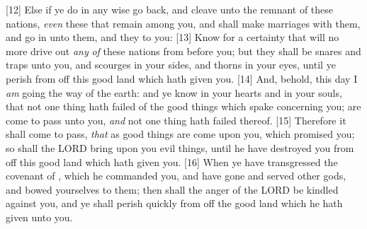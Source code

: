 [12] \textcolor[cmyk]{0.99998,1,0,0}{Else if ye do in any wise go back, and cleave unto the remnant of these nations, \emph{even} these that remain among you, and shall make marriages with them, and go in unto them, and they to you:}
[13] \textcolor[cmyk]{0.99998,1,0,0}{Know for a certainty that  will no more drive out \emph{any} \emph{of} these nations from before you; but they shall be snares and traps unto you, and scourges in your sides, and thorns in your eyes, until ye perish from off this good land which  hath given you.}
[14] \textcolor[cmyk]{0.99998,1,0,0}{And, behold, this day I \emph{am} going the way of  the earth: and ye know in  your hearts and in  your souls, that not one thing hath failed of  the good things which  spake concerning you;  are come to pass unto you, \emph{and} not one thing hath failed thereof.}
[15] \textcolor[cmyk]{0.99998,1,0,0}{Therefore it shall come to pass, \emph{that} as  good things are come upon you, which  promised you; so shall the LORD bring upon you  evil things, until he have destroyed you from off this good land which  hath given you.}
[16] \textcolor[cmyk]{0.99998,1,0,0}{When ye have transgressed the covenant of , which he commanded you, and have gone and served other gods, and bowed yourselves to them; then shall the anger of the LORD be kindled against you, and ye shall perish quickly from off the good land which he hath given unto you.}